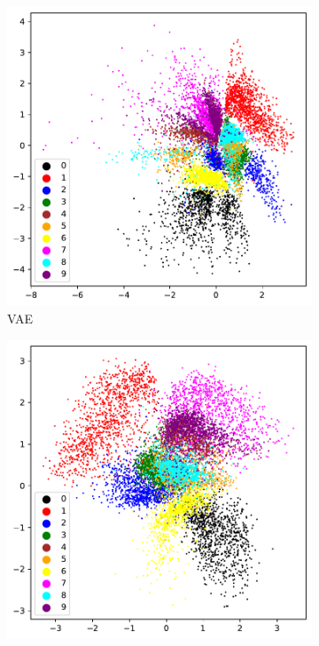 \begin{figure}%
	\begin{subfigure}[t]{0.49\textwidth}
		\centering
		\includegraphics[width = 1\textwidth]{figures/vae/clustering}
		\caption{VAE}
	\end{subfigure}
	\begin{subfigure}[t]{0.49\textwidth}
		\centering
		\includegraphics[width = 1\textwidth]{figures/cvae/clustering}

\end{subfigure}
\end{figure}
